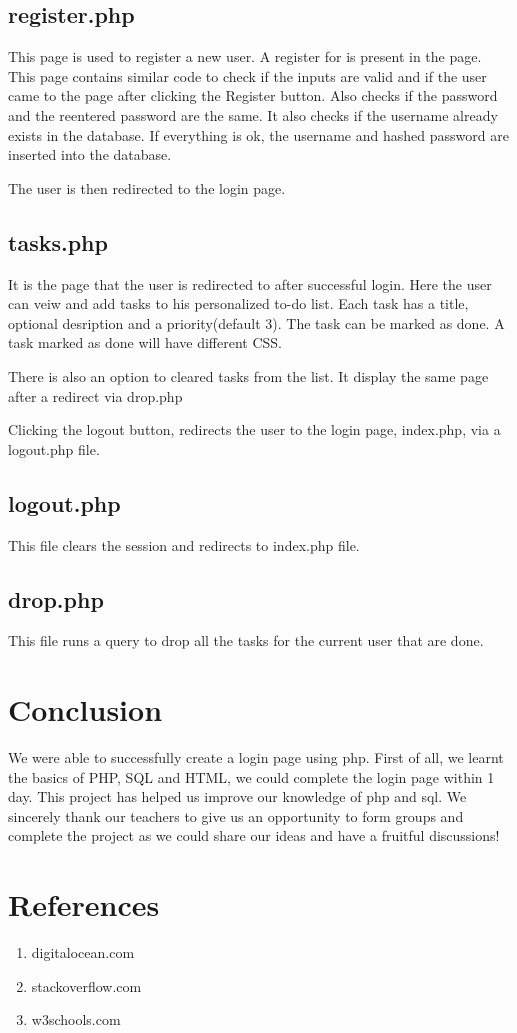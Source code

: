 \documentclass[10pt,a4paper,titlepage]{report}
\begin{document}
\section{register.php}
\par This page is used to register a new user. A register for is present in the page. This page contains similar code to check if the inputs are valid and if the user came to the page after clicking the Register button. Also checks if the password and the reentered password are the same. It also checks if the username already exists in the database. If everything is ok, the username and hashed password are inserted into the database. 
\par The user is then redirected to the login page.

\section{tasks.php}
\par It is the page that the user is redirected to after successful login. Here the user can veiw and add tasks to his personalized to-do list. Each task has a title, optional desription and a priority(default 3). The task can be marked as done. A task marked as done will have different CSS. 
\par There is also an option to cleared tasks from the list. It display the same page after a redirect via drop.php
\par Clicking the logout button, redirects the user to the login page, index.php, via a logout.php file. 

\section{logout.php}
\par This file clears the session and redirects to index.php file. 

\section{drop.php}
\par This file runs a query to drop all the tasks for the current user that are done.

\chapter{Conclusion}
\par We were able to successfully create a login page using php. First of all, we learnt the basics of PHP, SQL and HTML, we could complete the login page within 1 day. This project has helped us improve our knowledge of php and sql. We sincerely thank our teachers to give us an opportunity to form groups and complete the project as we could share our ideas and have a fruitful discussions!

\chapter{References}
\begin{enumerate}
		\item digitalocean.com
		\item stackoverflow.com
		\item w3schools.com
\end{enumerate}
\end{document}

